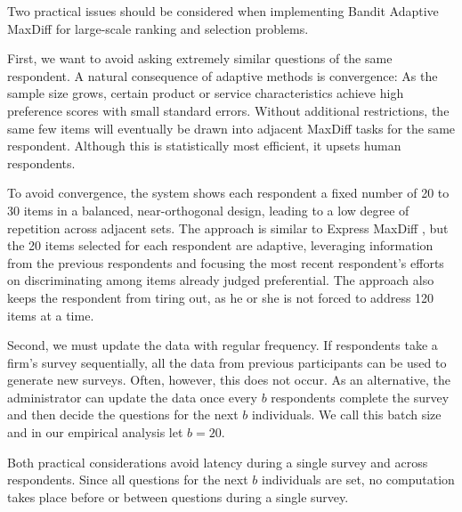 \documentclass[a4paper,11pt]{article}
\begin{document}
Two practical issues should be considered when implementing Bandit Adaptive MaxDiff for large-scale ranking and selection problems. 

First, we want to avoid asking extremely similar questions of the same respondent. A natural consequence of adaptive methods is convergence: As the sample size grows, certain product or service characteristics achieve high preference scores with small standard errors. Without additional restrictions, the same few items will eventually be drawn into adjacent MaxDiff tasks for the same respondent. Although this is statistically most efficient, it upsets human respondents. 

To avoid convergence, the system shows each respondent a fixed number of 20 to 30 items in a balanced, near-orthogonal design, leading to a low degree of repetition across adjacent sets. The approach is similar to Express MaxDiff \citep{wirth2012largeset}, but the 20 items selected for each respondent are adaptive, leveraging information from the previous respondents and focusing the most recent respondent's efforts on discriminating among items already judged preferential. The approach also keeps the respondent from tiring out, as he or she is not forced to address 120 items at a time.

Second, we must update the data with regular frequency. If respondents take a firm's survey sequentially, all the data from previous participants can be used to generate new surveys. Often, however, this does not occur. As an alternative, the administrator can update the data once every $b$ respondents complete the survey and then decide the questions for the next $b$ individuals. We call this batch size and in our empirical analysis let $b=20$.

Both practical considerations avoid latency during a single survey and across respondents. Since all questions for the next $b$ individuals are set, no computation takes place before or between questions during a single survey.
\end{document}
